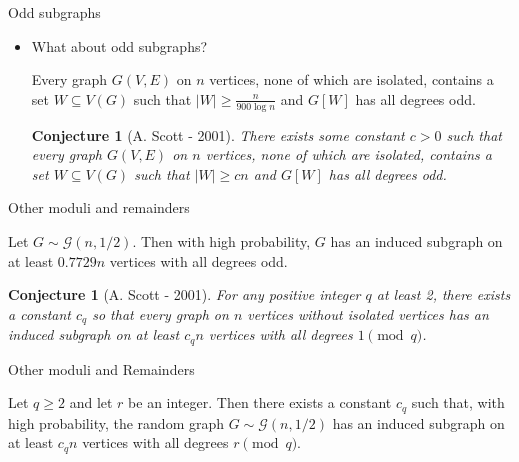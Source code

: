 \documentclass{beamer}
\theoremstyle{plain}
\newtheorem{conjecture}[theorem]{Conjecture}
\begin{document}
	\begin{frame}{Odd subgraphs}
		\begin{itemize}
			\item What about odd subgraphs?\pause

			\begin{theorem}[A. Scott - 1992]
				Every graph $G(V, E)$ on $n$ vertices, none of which are isolated, contains a set $W\subseteq V(G)$ such that $|W|\geq \frac{n}{900 \log n}$ and $G[W]$ has all degrees odd.
			\end{theorem}\pause

			\begin{conjecture}[A. Scott - 2001]
				There exists some constant $c>0$ such that every graph $G(V, E)$ on $n$ vertices, none of which are isolated, contains a set $W\subseteq V(G)$ such that $|W|\geq cn$ and $G[W]$ has all degrees odd.
			\end{conjecture}
		\end{itemize}
	\end{frame}


	\begin{frame}{Other moduli and remainders}

		\begin{theorem}[A. Scott - 1992]
			Let $G\sim \mathcal{G}(n, 1/2)$.
			Then with high probability, $G$ has an induced subgraph on at least $0.7729n$ vertices with all degrees odd.
		\end{theorem}\pause

		\begin{conjecture}[A. Scott - 2001]
			For any positive integer $q$ at least 2, there exists a constant $c_q$ so that every graph on $n$ vertices without isolated vertices has an induced subgraph on at least $c_qn$ vertices with all degrees $1\pmod q$.
		\end{conjecture}
	\end{frame}


	\begin{frame}{Other moduli and Remainders}
		\begin{theorem}
			Let $q\geq 2$ and let $r$ be an integer.
			Then there exists a constant $c_q$ such that, with high probability, the random graph $G\sim \mathcal{G}(n, 1/2)$ has an induced subgraph on at least $c_qn$ vertices with all degrees $r\pmod q$.
		\end{theorem}
	\end{frame}
\end{document}
